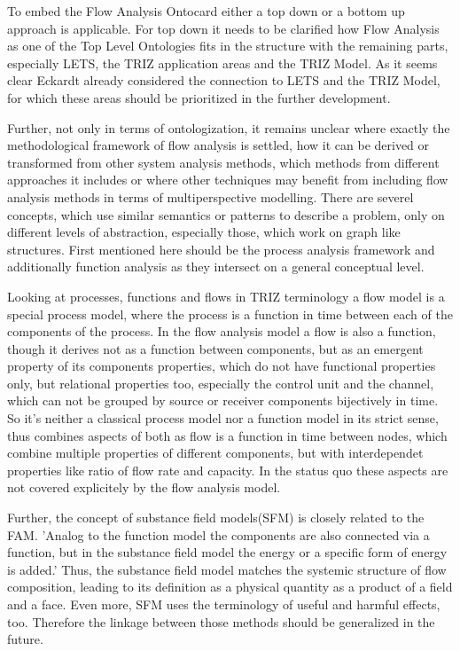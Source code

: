 \documentclass[a4paper,11pt]{article}
\begin{document}
\begin{itemize}
        To embed the Flow Analysis Ontocard either a top down or a bottom up approach is applicable. For top down it needs to be clarified how
        Flow Analysis as one of the Top Level Ontologies fits in the structure with the remaining parts, especially LETS, the TRIZ application areas and
        the TRIZ Model. As it seems clear Eckardt already considered the connection to LETS and the TRIZ Model, for which these areas should be prioritized
        in the further development.
        
        Further, not only in terms of ontologization, it remains unclear where exactly the methodological framework of flow
        analysis is settled, how it can be derived or transformed from other system analysis methods, which methods from different approaches it includes
        or where other techniques may benefit from including flow analysis methods in terms of multiperspective modelling. There are severel concepts, 
        which use similar semantics or patterns to describe a problem, only on different levels of abstraction, especially those, which work on graph
        like structures. First mentioned here should be the process analysis framework and additionally function analysis as they intersect on a general
        conceptual level.

        Looking at processes, functions and flows in TRIZ terminology \cite{Souchkov2018} \cite{Eckardt2020} a flow model is a special process model, where the process is a
        function in time between each of the components of the process. \cite{KoltzeSouchkov2017} In the flow analysis model a flow is also a function, though it derives not
        as a function between components, but as an emergent property of its components properties, which do not have functional properties only, but relational
        properties too, especially the control unit and the channel, which can not be grouped by source or receiver components bijectively in time. 
        So it's neither a classical process model nor a function model in its strict sense, thus combines aspects of both as flow is a function in time between nodes, 
        which combine multiple properties of different components, but with interdependet properties like ratio of flow rate and capacity. In the status
        quo these aspects are not covered explicitely by the flow analysis model.

        Further, the concept of substance field models(SFM) is closely related to the FAM. 'Analog to the function model the components are also connected
        via a function, but in the substance field model the energy or a specific form of energy is added.' \cite{KoltzeSouchkov2017} Thus, the substance field model
        matches the systemic structure of flow composition, leading to its definition as a physical quantity as a product of a field and a face. \cite{Flussdefinition(Physik)}
        Even more, SFM uses the terminology of useful and harmful effects, too. \cite{KoltzeSouchkov2017} Therefore the linkage between those methods should be generalized in the
        future.


\end{itemize}
\end{document}
